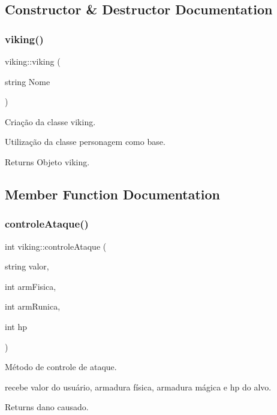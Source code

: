 \subsection{Constructor \& Destructor Documentation}
\mbox{\label{classviking_aec7e94a062284984afac0ffc49ea5213}} 
\subsubsection{\texorpdfstring{viking()}{viking()}}
{\footnotesize\ttfamily viking\+::viking (\begin{DoxyParamCaption}\item[{string}]{Nome }\end{DoxyParamCaption})}



Criação da classe viking. 

Utilização da classe personagem como base. \begin{DoxyReturn}{Returns}
Objeto viking. 
\end{DoxyReturn}


\subsection{Member Function Documentation}
\mbox{\label{classviking_aba7bbd831d9b38d98b74ca805d2ea250}} 
\subsubsection{\texorpdfstring{controle\+Ataque()}{controleAtaque()}}
{\footnotesize\ttfamily int viking\+::controle\+Ataque (\begin{DoxyParamCaption}\item[{string}]{valor,  }\item[{int}]{arm\+Fisica,  }\item[{int}]{arm\+Runica,  }\item[{int}]{hp }\end{DoxyParamCaption})}



Método de controle de ataque. 

recebe valor do usuário, armadura física, armadura mágica e hp do alvo. \begin{DoxyReturn}{Returns}
dano causado. 
\end{DoxyReturn}
\mbox{\label{classviking_a5d9d645dae5e647b668c57afa0be1cd8}} 

